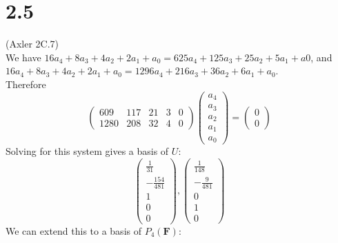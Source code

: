 \documentclass{article}
\begin{document}
\section{2.5}
(Axler 2C.7)\\
We have $16a_4 + 8a_3 + 4a_2 + 2a_1 + a_0 = 625a_4 + 125a_3 + 25a_2 + 5a_1 + a0$, and $16a_4 + 8a_3 + 4a_2 + 2a_1 + a_0 = 1296a_4 + 216a_3 + 36a_2 + 6a_1 + a_0$.\\
Therefore
\begin{equation*}
    \begin{pmatrix}
    609 & 117 & 21 & 3 & 0\\
    1280 & 208 & 32 & 4 & 0
    \end{pmatrix}
    \begin{pmatrix}
    a_4\\
    a_3\\
    a_2\\
    a_1\\
    a_0
    \end{pmatrix} =
    \begin{pmatrix}
    0\\
    0
    \end{pmatrix}
\end{equation*}
Solving for this system gives a basis of $U$:
\begin{equation*}
    \begin{pmatrix}
    \frac{1}{31}\\
    -\frac{154}{481}\\
    1\\
    0\\
    0
    \end{pmatrix},
    \begin{pmatrix}
    \frac{1}{148}\\
    -\frac{9}{481}\\
    0\\
    1\\
    0
    \end{pmatrix}
\end{equation*}
We can extend this to a basis of $P_4(\textbf{F})$:
\end{document}
